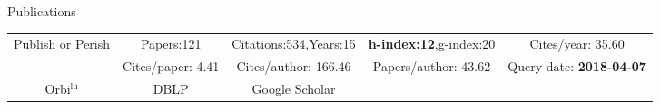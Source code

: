 \begin{rubrique}{Publications}

  {\footnotesize

    \vspace*{-2em}
    \begin{center}
      \begin{tabular}{|c||cccc|}
        \hline
        \multirow{2}{4em}{\href{http://www.harzing.com/pop.htm}{Publish or Perish}}
        & Papers:121        & Citations:534,Years:15   & \textbf{h-index:12},g-index:20 & Cites/year: 35.60\\
        & Cites/paper: 4.41 & Cites/author: 166.46 & Papers/author: 43.62 & Query date: \textbf{2018-04-07}\\
        \hline
        \href{https://orbilu.uni.lu/simple-search?query=varrette}{Orbi$^\text{lu}$} &
        \multicolumn{1}{c|}{\href{http://www.informatik.uni-trier.de/~ley/pers/hd/v/Varrette:S=eacute=bastien.html}{DBLP}} &                                                                                                \multicolumn{1}{c|}{\href{https://scholar.google.fr/citations?hl=fr\&user=6PTStIcAAAAJ\&view_op=list_works\&sortby=pubdate}{Google Scholar}}\\
        \cline{1-3}
      \end{tabular}
    \end{center}
  }




\end{rubrique}





%
